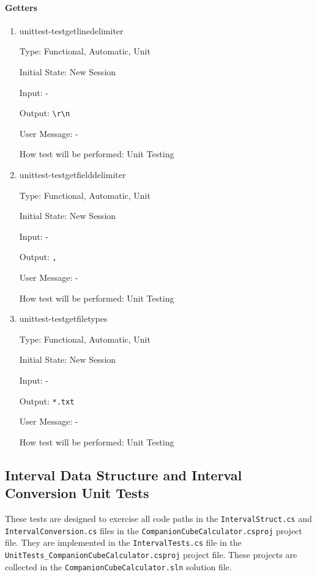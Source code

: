 \documentclass[12pt, titlepage]{article}
\begin{document}
\paragraph{Getters}
\begin{enumerate}
	\item{unittest-testgetlinedelimiter}
	
	Type: Functional, Automatic, Unit
	
	Initial State: New Session
	
	Input: -
	
	Output: \texttt{\textbackslash r\textbackslash n}
	
	User Message: - 
	
	How test will be performed: Unit Testing\\
	
	\item{unittest-testgetfielddelimiter}
	
	Type: Functional, Automatic, Unit
	
	Initial State: New Session
	
	Input: -
	
	Output: \texttt{,}
	
	User Message: - 
	
	How test will be performed: Unit Testing\\
	
	\item{unittest-testgetfiletypes}
	
	Type: Functional, Automatic, Unit
	
	Initial State: New Session
	
	Input: -
	
	Output: \texttt{*.txt}
	
	User Message: - 
	
	How test will be performed: Unit Testing\\
	
\end{enumerate}

\subsection{Interval Data Structure and Interval Conversion Unit Tests}
These tests are designed to exercise all code paths in the 
\texttt{IntervalStruct.cs} and \texttt{IntervalConversion.cs}
files in the \texttt{CompanionCubeCalculator.csproj} project file. They are 
implemented in the \texttt{IntervalTests.cs} file in the \\
\texttt{UnitTests\_CompanionCubeCalculator.csproj} project file. These projects 
are collected in the \texttt{CompanionCubeCalculator.sln} solution file.
\end{document}
